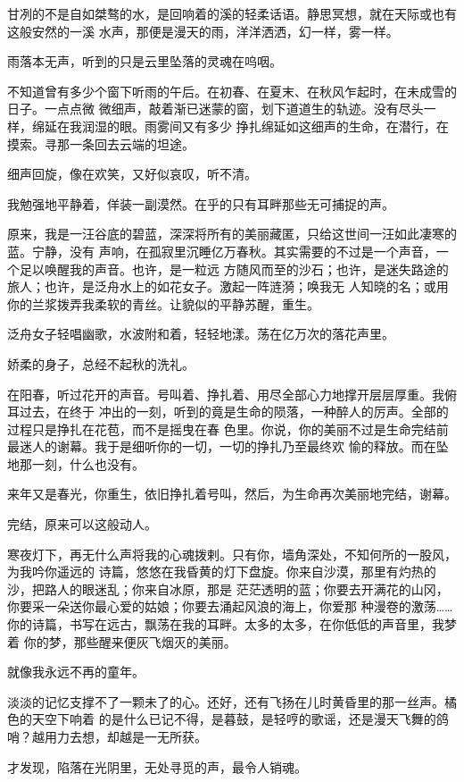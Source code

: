 		甘冽的不是自如桀骜的水，是回响着的溪的轻柔话语。静思冥想，就在天际或也有这般安然的一溪
	水声，那便是漫天的雨，洋洋洒洒，幻一样，雾一样。

		雨落本无声，听到的只是云里坠落的灵魂在呜咽。

		不知道曾有多少个窗下听雨的午后。在初春、在夏末、在秋风乍起时，在未成雪的日子。一点点微
	微细声，敲着渐已迷蒙的窗，划下道道生的轨迹。没有尽头一样，绵延在我润湿的眼。雨雾间又有多少
	挣扎绵延如这细声的生命，在潜行，在摸索。寻那一条回去云端的坦途。

		细声回旋，像在欢笑，又好似哀叹，听不清。

		我勉强地平静着，佯装一副漠然。在乎的只有耳畔那些无可捕捉的声。

		原来，我是一汪谷底的碧蓝，深深将所有的美丽藏匿，只给这世间一汪如此凄寒的蓝。宁静，没有
	声响，在孤寂里沉睡亿万春秋。其实需要的不过是一个声音，一个足以唤醒我的声音。也许，是一粒远
	方随风而至的沙石；也许，是迷失路途的旅人；也许，是泛舟水上的如花女子。激起一阵涟漪；唤我无
	人知晓的名；或用你的兰浆拨弄我柔软的青丝。让貌似的平静苏醒，重生。

		泛舟女子轻唱幽歌，水波附和着，轻轻地漾。荡在亿万次的落花声里。

		娇柔的身子，总经不起秋的洗礼。

		在阳春，听过花开的声音。号叫着、挣扎着、用尽全部心力地撑开层层厚重。我俯耳过去，在终于
	冲出的一刻，听到的竟是生命的陨落，一种醉人的厉声。全部的过程只是挣扎在花苞，而不是摇曳在春
	色里。你说，你的美丽不过是生命完结前最迷人的谢幕。我于是细听你的一切，一切的挣扎乃至最终欢
	愉的释放。而在坠地那一刻，什么也没有。

		来年又是春光，你重生，依旧挣扎着号叫，然后，为生命再次美丽地完结，谢幕。

		完结，原来可以这般动人。

		寒夜灯下，再无什么声将我的心魂拨剌。只有你，墙角深处，不知何所的一股风，为我吟你遥远的
	诗篇，悠悠在我昏黄的灯下盘旋。你来自沙漠，那里有灼热的沙，把路人的眼迷乱；你来自冰原，那是
	茫茫透明的蓝；你要去开满花的山冈，你要采一朵送你最心爱的姑娘；你要去涌起风浪的海上，你爱那
	种漫卷的激荡…… 你的诗篇，书写在远古，飘荡在我的耳畔。太多的太多，在你低低的声音里，我梦着
	你的梦，那些醒来便灰飞烟灭的美丽。

		就像我永远不再的童年。

		淡淡的记忆支撑不了一颗未了的心。还好，还有飞扬在儿时黄昏里的那一丝声。橘色的天空下响着
	的是什么已记不得，是暮鼓，是轻哼的歌谣，还是漫天飞舞的鸽哨？越用力去想，却越是一无所获。

		才发现，陷落在光阴里，无处寻觅的声，最令人销魂。

